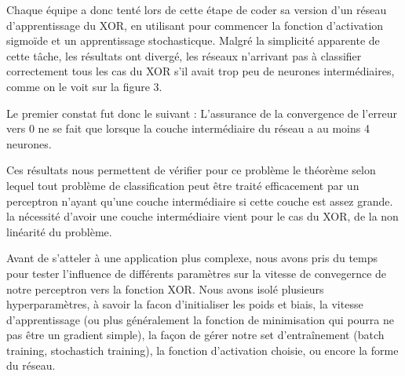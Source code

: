 \documentclass[
    10pt,
    a4paper,
    oneside,
    headinclude,footinclude,
    BCOR=5mm,
    captions=tableabove
]{scrartcl}
\begin{document}
 Chaque équipe a donc tenté lors de cette étape de coder sa version d'un réseau d'apprentissage du XOR, en utilisant pour commencer la fonction d'activation sigmoïde et un apprentissage stochasticque. Malgré la simplicité apparente de cette tâche, les résultats ont divergé, les réseaux n'arrivant pas à classifier correctement tous les cas du XOR s'il avait trop peu de neurones intermédiaires, comme on le voit sur la figure 3.

Le premier constat fut donc le suivant : L'assurance de la convergence de l'erreur vers $0$ ne se fait que lorsque la couche intermédiaire du réseau a au moins 4 neurones.

Ces résultats nous permettent de vérifier pour ce problème le théorème selon lequel tout problème de classification peut être traité efficacement par un perceptron n'ayant qu'une couche intermédiaire si cette couche est assez grande. la nécessité d'avoir une couche intermédiaire vient pour le cas du XOR, de la non linéarité du problème.

Avant de s'atteler à une application plus complexe, nous avons pris du temps pour tester l'influence de différents paramètres sur la vitesse de convegernce de notre perceptron vers la fonction XOR. 
Nous avons isolé plusieurs hyperparamètres, à savoir  la facon d'initialiser les poids et biais, la vitesse d'apprentissage (ou plus généralement la fonction de minimisation qui pourra ne pas être un gradient simple), la façon de gérer notre set d'entraînement (batch training, stochastich training), la fonction d'activation choisie, ou encore la forme du réseau.
\end{document}
